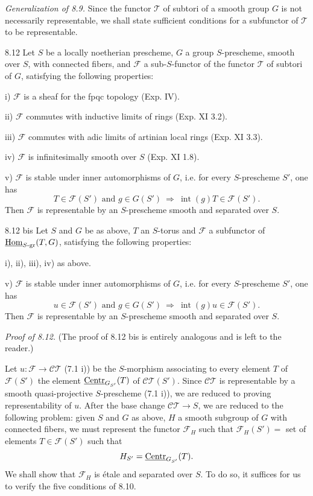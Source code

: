 \par\noindent\emph{Generalization of 8.9.}
Since the functor $\mathscr T$ of subtori of a smooth group $G$ is not necessarily representable, we shall state sufficient conditions for a subfunctor of $\mathscr T$ to be representable.
\begin{proposition}{8.12}\label{XV.8.12}
Let $S$ be a locally noetherian prescheme, $G$ a group $S$-prescheme, smooth over $S$, with connected fibers, and $\mathscr F$ a sub-$S$-functor of the functor $\mathscr T$ of subtori of $G$, satisfying the following properties:

\noindent i) $\mathscr F$ is a sheaf for the fpqc topology (Exp. IV).

\noindent ii) $\mathscr F$ commutes with inductive limits of rings (Exp. XI 3.2).

\noindent iii) $\mathscr F$ commutes with adic limits of artinian local rings (Exp. XI 3.3).

\noindent iv) $\mathscr F$ is infinitesimally smooth over $S$ (Exp. XI 1.8).

\noindent v) $\mathscr F$ is stable under inner automorphisms of $G$, i.e. for every $S$-prescheme $S'$, one has
\[
T\in\mathscr F(S')\text{ and }g\in G(S')\ \Rightarrow\ \operatorname{int}(g)T\in\mathscr F(S').
\]
Then $\mathscr F$ is representable by an $S$-prescheme smooth and separated over $S$.
\end{proposition}
\begin{proposition}{8.12 bis}\label{XV.8.12bis}
Let $S$ and $G$ be as above, $T$ an $S$-torus and $\mathscr F$ a subfunctor of $\underline{\operatorname{Hom}}_{S\text{-gr}}(T,G)$, satisfying the following properties:

\noindent i), ii), iii), iv) as above.

\noindent v) $\mathscr F$ is stable under inner automorphisms of $G$, i.e. for every $S$-prescheme $S'$, one has
\[
u\in\mathscr F(S')\text{ and }g\in G(S')\ \Rightarrow\ \operatorname{int}(g)u\in\mathscr F(S').
\]
Then $\mathscr F$ is representable by an $S$-prescheme smooth and separated over $S$.
\end{proposition}
\par\noindent\emph{Proof of 8.12.}
(The proof of 8.12 bis is entirely analogous and is left to the reader.)

Let $u:\mathscr F\to\mathscr{CT}$ (7.1 i)) be the $S$-morphism associating to every element $T$ of $\mathscr F(S')$ the element $\underline{\mathrm{Centr}}_{G_{S'}}(T)$ of $\mathscr{CT}(S')$. Since $\mathscr{CT}$ is representable by a smooth quasi-projective $S$-prescheme (7.1 i)), we are reduced to proving representability of $u$. After the base change $\mathscr{CT}\to S$, we are reduced to the following problem: given $S$ and $G$ as above, $H$ a smooth subgroup of $G$ with connected fibers, we must represent the functor $\mathscr F_H$ such that $\mathscr F_H(S')=$ set of elements $T\in\mathscr F(S')$ such that
\[
H_{S'}=\underline{\mathrm{Centr}}_{G_{S'}}(T).
\]
We shall show that $\mathscr F_H$ is étale and separated over $S$. To do so, it suffices for us to verify the five conditions of 8.10.

